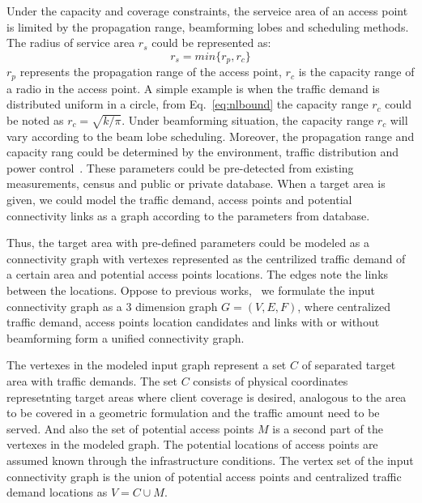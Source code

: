 Under the capacity and coverage constraints, the serveice area of an access point 
is limited by the propagation range, beamforming lobes and scheduling methods. 
The radius of service area $r_s$ could be represented as:
\begin{equation}
\label{eq:servicearea}
r_s=min\{r_p,r_c\}
\end{equation}
$r_p$ represents the propagation range of the access point, $r_c$ is the capacity range of 
a radio in the access point. A simple example is when the traffic demand is distributed uniform in a circle, from 
Eq.~\ref{eq:nlbound} the capacity range $r_c$ could be noted as $r_c=\sqrt{k/\pi}$. 
Under beamforming situation, the capacity range $r_c$ will vary according to the 
beam lobe scheduling.
Moreover, the propagation range and capacity rang could be determined by the environment, traffic distribution and
power control~\cite{robinson2010deploying}. 
These parameters could be pre-detected from existing measurements, census and public or private database.
When a target area is given, we could model the traffic demand, access points and
potential connectivity links as a graph according to the parameters from database.


Thus, the target area with pre-defined parameters could be modeled as a connectivity graph with 
vertexes represented as the centrilized traffic demand of a certain area and potential access points
locations. The edges note the links between the locations. 
Oppose to previous works,~\cite{robinson2010deploying,franklin2007node,tang2005interference,}
we formulate the input connectivity graph as a $3$ dimension graph $G = (V,E,F)$, where centralized
traffic demand, access points location candidates and links with or without beamforming form a
unified connectivity graph. 

The vertexes in the modeled input graph represent a set $C$ of  separated target area with traffic demands.
The set $C$ consists of physical coordinates represetnting target areas where client coverage is 
desired, analogous to the area to be covered in a geometric formulation and the traffic amount
need to be served.
And also the set of potential access points $M$ is a second part of the vertexes in the 
modeled graph. The potential locations of access points are assumed known through the 
infrastructure conditions.
The vertex set of the input connectivity graph is the union of potential access points
and centralized traffic demand locations as $V = C\cup M$.

